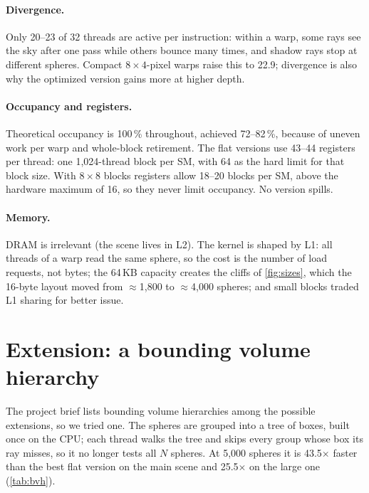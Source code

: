 \documentclass[11pt,a4paper]{article}
\begin{document}
\paragraph{Divergence.} Only 20--23 of 32 threads are active per instruction: within a warp, some
rays see the sky after one pass while others bounce many times, and shadow rays stop at different
spheres. Compact $8 \times 4$-pixel warps raise this to 22.9; divergence is also why the optimized
version gains more at higher depth.

\paragraph{Occupancy and registers.} Theoretical occupancy is 100\,\% throughout, achieved 72--82\,\%,
because of uneven work per warp and whole-block retirement. The flat versions use 43--44 registers per
thread: one 1,024-thread block per SM, with 64 as the hard limit for that block size. With
$8 \times 8$ blocks registers allow 18--20 blocks per SM, above the hardware maximum of 16, so they
never limit occupancy. No version spills.

\paragraph{Memory.} DRAM is irrelevant (the scene lives in L2). The kernel is shaped by L1: all
threads of a warp read the same sphere, so the cost is the number of load requests, not bytes; the
64\,KB capacity creates the cliffs of \cref{fig:sizes}, which the 16-byte layout moved from
$\approx$1,800 to $\approx$4,000 spheres; and small blocks traded L1 sharing for better issue.

\section{Extension: a bounding volume hierarchy}
\label{sec:bvh}

The project brief lists bounding volume hierarchies among the possible extensions, so we tried one.
The spheres are grouped into a tree of boxes, built once on the CPU; each thread walks the tree and
skips every group whose box its ray misses, so it no longer tests all $N$ spheres. At 5,000 spheres
it is 43.5$\times$ faster than the best flat version on the main scene and 25.5$\times$ on the large
one (\cref{tab:bvh}).
\end{document}
